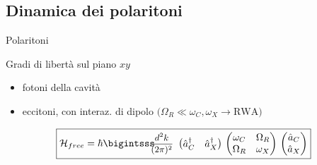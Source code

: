 \subsection{Dinamica dei polaritoni}
 
\begin{frame}{Polaritoni}


  Gradi di libertà sul piano $xy$
  \begin{itemize}
    \item fotoni della cavità
    \item eccitoni, con interaz. di dipolo \(\big(\Omega_R \ll \omega_C, \omega_X \rightarrow \text{RWA}\big)\)
  \end{itemize}

  
 \begin{equation*}
 \boxed{
     \ham_{free} = \hbar \displaystyle \intk
      \begin{pmatrix} \oa_C^\dagger & \oa_X^\dagger \end{pmatrix}\,
      \begin{pmatrix} \omega_C & \Omega_R \\ \Omega_R & \omega_X \end{pmatrix}\,\begin{pmatrix}\oa_C \\ \oa_X \end{pmatrix}
    }  
   \end{equation*}

\vspace{-15pt}
\begin{minipage}{\textwidth}
\end{minipage}
\end{frame}
